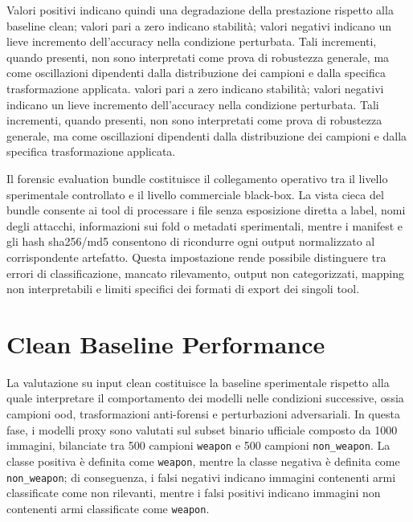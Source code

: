 Valori positivi indicano quindi una degradazione della prestazione rispetto alla
baseline clean; valori pari a zero indicano stabilità; valori negativi indicano
un lieve incremento dell'accuracy nella condizione perturbata. Tali incrementi,
quando presenti, non sono interpretati come prova di robustezza generale, ma come
oscillazioni dipendenti dalla distribuzione dei campioni e dalla specifica
trasformazione applicata. valori pari a zero indicano stabilità; valori negativi indicano
un lieve incremento dell'accuracy nella condizione perturbata. Tali incrementi,
quando presenti, non sono interpretati come prova di robustezza generale, ma come
oscillazioni dipendenti dalla distribuzione dei campioni e dalla specifica
trasformazione applicata.

Il forensic evaluation bundle costituisce il collegamento operativo tra il
livello sperimentale controllato e il livello commerciale black-box. La vista
cieca del bundle consente ai tool di processare i file senza esposizione diretta
a label, nomi degli attacchi, informazioni sui fold o metadati sperimentali,
mentre i manifest e gli hash \gls{sha256}/\gls{md5} consentono di ricondurre
ogni output normalizzato al corrispondente artefatto. Questa impostazione rende
possibile distinguere tra errori di classificazione, mancato rilevamento, output
non categorizzati, mapping non interpretabili e limiti specifici dei formati di
export dei singoli tool.



\section{Clean Baseline Performance}
\label{sec:results-clean-baseline}

La valutazione su input clean costituisce la baseline sperimentale rispetto alla
quale interpretare il comportamento dei modelli nelle condizioni successive,
ossia campioni \gls{ood}, trasformazioni anti-forensi e perturbazioni
adversariali. In questa fase, i modelli proxy sono valutati sul subset binario
ufficiale composto da 1000 immagini, bilanciate tra 500 campioni
\texttt{weapon} e 500 campioni \texttt{non\_weapon}. La classe positiva è
definita come \texttt{weapon}, mentre la classe negativa è definita come
\texttt{non\_weapon}; di conseguenza, i falsi negativi indicano immagini
contenenti armi classificate come non rilevanti, mentre i falsi positivi indicano
immagini non contenenti armi classificate come \texttt{weapon}.

